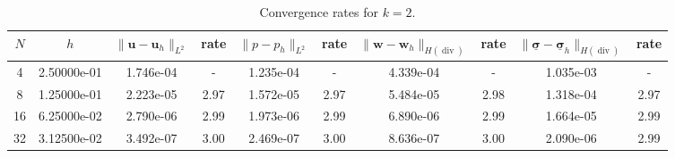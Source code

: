 \begin{table}[ht!]
\centering
\begin{tabular}{c c c c c c c c c c}
\hline
$N$ & $h$ & $\|\mathbf{u}-\mathbf{u}_h\|_{L^2}$ & rate & $\|p-p_h\|_{L^2}$ & rate & $\|\mathbf{w}-\mathbf{w}_h\|_{H(\operatorname{div})}$ & rate & $\|\underline{\boldsymbol{\sigma}}-\underline{\boldsymbol{\sigma}}_h\|_{H(\operatorname{div})}$ & rate \\
\hline
4 & 2.50000e-01 & 1.746e-04 & - & 1.235e-04 & - & 4.339e-04 & - & 1.035e-03 & - \\
8 & 1.25000e-01 & 2.223e-05 & 2.97 & 1.572e-05 & 2.97 & 5.484e-05 & 2.98 & 1.318e-04 & 2.97 \\
16 & 6.25000e-02 & 2.790e-06 & 2.99 & 1.973e-06 & 2.99 & 6.890e-06 & 2.99 & 1.664e-05 & 2.99 \\
32 & 3.12500e-02 & 3.492e-07 & 3.00 & 2.469e-07 & 3.00 & 8.636e-07 & 3.00 & 2.090e-06 & 2.99 \\
\hline
\end{tabular}
\caption{Convergence rates for $k=2$.}
\label{tab:biot_convergence_single_k2}
\end{table}
